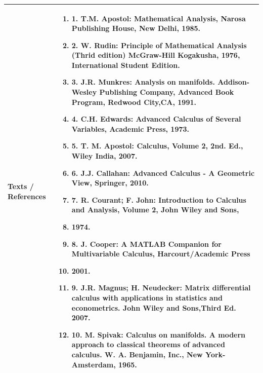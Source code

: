 \documentclass[11pt,a4paper]{article}
\begin{document}
\begin{tabularx}{\textwidth}{|p{3.2cm}|X|}
\hline
\textbf{Texts / References} & \begin{enumerate}[leftmargin=*,noitemsep,topsep=2pt]  \item 1. T.M. Apostol: Mathematical Analysis, Narosa Publishing House, New Delhi, 1985.  \item 2. W. Rudin: Principle of Mathematical Analysis (Thrid edition) McGraw-Hill Kogakusha, 1976,  International Student Edition.  \item 3. J.R. Munkres: Analysis on manifolds. Addison-Wesley Publishing Company, Advanced Book  Program, Redwood City,CA, 1991.  \item 4. C.H. Edwards: Advanced Calculus of Several Variables, Academic Press, 1973.  \item 5. T. M. Apostol: Calculus, Volume 2, 2nd. Ed., Wiley India, 2007.  \item 6. J.J. Callahan: Advanced Calculus - A Geometric View, Springer, 2010.  \item 7. R. Courant; F. John: Introduction to Calculus and Analysis, Volume 2, John Wiley and Sons,  \item 1974.  \item 8. J. Cooper: A MATLAB Companion for Multivariable Calculus, Harcourt/Academic Press  \item 2001.  \item 9. J.R. Magnus; H. Neudecker: Matrix differential calculus with applications in statistics and  econometrics. John Wiley and Sons,Third Ed. 2007.  \item 10. M. Spivak: Calculus on manifolds. A modern approach to classical theorems of advanced  calculus. W. A. Benjamin, Inc., New York-Amsterdam, 1965.\end{enumerate} \\
\hline
\end{tabularx}
\clearpage
\end{document}
